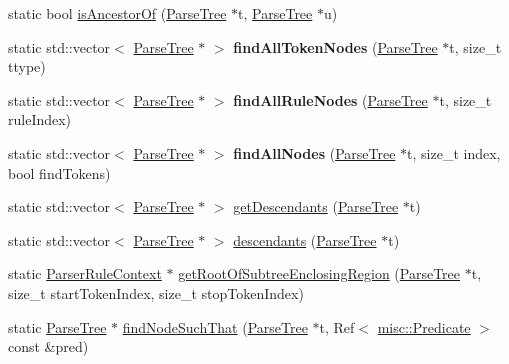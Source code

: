 \begin{DoxyCompactItemize}
\item 
static bool \hyperlink{classantlr4_1_1tree_1_1Trees_a85f8d8b2badb30b1153b20f6f9c4c62b}{is\+Ancestor\+Of} (\hyperlink{classantlr4_1_1tree_1_1ParseTree}{Parse\+Tree} $\ast$t, \hyperlink{classantlr4_1_1tree_1_1ParseTree}{Parse\+Tree} $\ast$u)
\item 
\mbox{\label{classantlr4_1_1tree_1_1Trees_a65df1be874230244c0f8efc3da521784}} 
static std\+::vector$<$ \hyperlink{classantlr4_1_1tree_1_1ParseTree}{Parse\+Tree} $\ast$ $>$ {\bfseries find\+All\+Token\+Nodes} (\hyperlink{classantlr4_1_1tree_1_1ParseTree}{Parse\+Tree} $\ast$t, size\+\_\+t ttype)
\item 
\mbox{\label{classantlr4_1_1tree_1_1Trees_a582916967d9dc52fb621644e0b52c661}} 
static std\+::vector$<$ \hyperlink{classantlr4_1_1tree_1_1ParseTree}{Parse\+Tree} $\ast$ $>$ {\bfseries find\+All\+Rule\+Nodes} (\hyperlink{classantlr4_1_1tree_1_1ParseTree}{Parse\+Tree} $\ast$t, size\+\_\+t rule\+Index)
\item 
\mbox{\label{classantlr4_1_1tree_1_1Trees_afaf9b685ce15fdba1e2a4b4fe0b8fe94}} 
static std\+::vector$<$ \hyperlink{classantlr4_1_1tree_1_1ParseTree}{Parse\+Tree} $\ast$ $>$ {\bfseries find\+All\+Nodes} (\hyperlink{classantlr4_1_1tree_1_1ParseTree}{Parse\+Tree} $\ast$t, size\+\_\+t index, bool find\+Tokens)
\item 
static std\+::vector$<$ \hyperlink{classantlr4_1_1tree_1_1ParseTree}{Parse\+Tree} $\ast$ $>$ \hyperlink{classantlr4_1_1tree_1_1Trees_ad965d3e9ff6395d1b757e0cf757a73d7}{get\+Descendants} (\hyperlink{classantlr4_1_1tree_1_1ParseTree}{Parse\+Tree} $\ast$t)
\item 
static std\+::vector$<$ \hyperlink{classantlr4_1_1tree_1_1ParseTree}{Parse\+Tree} $\ast$ $>$ \hyperlink{classantlr4_1_1tree_1_1Trees_a5eda3fa3fdcf06c495254f71d8cdb9ee}{descendants} (\hyperlink{classantlr4_1_1tree_1_1ParseTree}{Parse\+Tree} $\ast$t)
\item 
static \hyperlink{classantlr4_1_1ParserRuleContext}{Parser\+Rule\+Context} $\ast$ \hyperlink{classantlr4_1_1tree_1_1Trees_a84a58ac34196e16cfc51a14bf1263656}{get\+Root\+Of\+Subtree\+Enclosing\+Region} (\hyperlink{classantlr4_1_1tree_1_1ParseTree}{Parse\+Tree} $\ast$t, size\+\_\+t start\+Token\+Index, size\+\_\+t stop\+Token\+Index)
\item 
static \hyperlink{classantlr4_1_1tree_1_1ParseTree}{Parse\+Tree} $\ast$ \hyperlink{classantlr4_1_1tree_1_1Trees_a2e870a18be6a1dfda86d8be8945a44e5}{find\+Node\+Such\+That} (\hyperlink{classantlr4_1_1tree_1_1ParseTree}{Parse\+Tree} $\ast$t, Ref$<$ \hyperlink{classantlr4_1_1misc_1_1Predicate}{misc\+::\+Predicate} $>$ const \&pred)
\end{DoxyCompactItemize}


